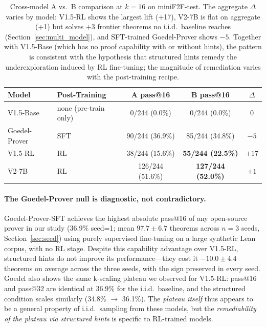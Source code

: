 \documentclass{article}
\begin{document}
\begin{table}[h]
\centering
\small
\begin{tabular}{llccc}
\toprule
\textbf{Model} & \textbf{Post-Training} & \textbf{A pass@16} & \textbf{B pass@16} & \textbf{$\Delta$} \\
\midrule
V1.5-Base    & none (pre-train only) & 0/244 (0.0\%)    & 0/244 (0.0\%)    & 0    \\
Goedel-Prover & SFT                  & 90/244 (36.9\%)  & 85/244 (34.8\%)  & $-5$ \\
\midrule
V1.5-RL      & RL                    & 38/244 (15.6\%)  & \textbf{55/244 (22.5\%)} & $+17$ \\
V2-7B        & RL                    & 126/244 (51.6\%) & \textbf{127/244 (52.0\%)} & $+1$ \\
\bottomrule
\end{tabular}
\caption{Cross-model A vs.\ B comparison at $k{=}16$ on miniF2F-test. The aggregate $\Delta$ varies by model: V1.5-RL shows the largest lift (+17), V2-7B is flat on aggregate (+1) but solves $+3$ frontier theorems no i.i.d.\ baseline reaches (Section~\ref{sec:multi_model}), and SFT-trained Goedel-Prover shows $-5$. Together with V1.5-Base (which has no proof capability with or without hints), the pattern is consistent with the hypothesis that structured hints remedy the underexploration induced by RL fine-tuning; the magnitude of remediation varies with the post-training recipe.}
\label{tab:cross_model}
\end{table}

\paragraph{The Goedel-Prover null is diagnostic, not contradictory.} Goedel-Prover-SFT achieves the highest absolute pass@16 of any open-source prover in our study (36.9\% seed=1; mean $97.7 \pm 6.7$ theorems across $n{=}3$ seeds, Section~\ref{sec:seed}) using purely supervised fine-tuning on a large synthetic Lean corpus, with no RL stage. Despite this capability advantage over V1.5-RL, structured hints do not improve its performance---they cost it $-10.0 \pm 4.4$ theorems on average across the three seeds, with the sign preserved in every seed. Goedel also shows the same k-scaling plateau we observed for V1.5-RL: pass@16 and pass@32 are identical at 36.9\% for the i.i.d.\ baseline, and the structured condition scales similarly (34.8\% $\to$ 36.1\%). The \emph{plateau itself} thus appears to be a general property of i.i.d.\ sampling from these models, but the \emph{remediability of the plateau via structured hints} is specific to RL-trained models.
\end{document}
